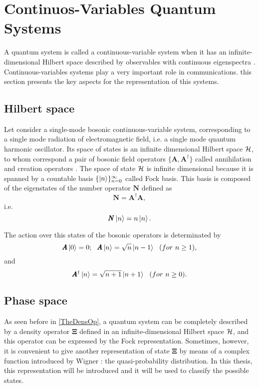 \section{Continuos-Variables Quantum Systems}
    A quantum system is called a continuous-variable system
    when it has an infinite-dimensional Hilbert space described
    by observables with continuous eigenspectra \cite{ContinuousVar}.
    Continuous-variables systems play a very important role in communications. this
    section presents the key aspects for the representation of this systems.
            
    \subsection{Hilbert space}
        Let consider a single-mode bosonic continuous-variable system, corresponding to a single
        mode radiation of electromagnetic field, i.e. a single mode quantum harmonic oscillator.
        Its space of states is an infinite dimensional Hilbert space $\mathcal{H}$, to whom correspond
        a pair of bosonic field operators $\{ \pmb{A},\pmb{A}^{\dagger}\}$ called annihilation
        and creation operators \cite{ContinuousVar}.
        The space of state $\mathcal{H}$ is infinite dimensional because it is spanned by a countable
        basis $\{\ket{n}\}_{n=0}^\infty$ called Fock basis. This basis is composed of the
        eigenstates of the number operator $\pmb{N}$ defined as
        \begin{equation}
            \pmb{N}=\pmb{A}^\dagger \pmb{A},
        \end{equation}
        i.e. 
        \begin{equation*}
            \pmb{N}\ket{n}=n\ket{n}.
        \end{equation*}

        The action over this states of the bosonic operators is determinated by \cite{ContinuousVar}
        \begin{equation}
            \pmb{A}\ket{0}=0;\ \ \pmb{A}\ket{n}=\sqrt{n}\ket{n-1}\ \ (for\ n \geq 1),
        \end{equation}
        and
        \begin{equation*}
            \pmb{A}^\dagger\ket{n}=\sqrt{n+1}\ket{n+1}\ \ (for\ n \geq 0).
        \end{equation*}
        
        
    \subsection{Phase space}
        As seen before in \ref{TheDensOp}, a quantum system can be completely
        described by a density operator $\pmb{\Xi}$ defined in an infinite-dimensional Hilbert space
        $\mathcal{H}$, and this operator can be expressed by the Fock representation. %
        Sometimes, however, it is convenient to give another representation of state $\pmb{\Xi}$ by
        means of a complex function introduced by Wigner \cite{Wigner}: the quasi-probability 
        distribution. In this thesis, this representation will be introduced and it will be used to
        classify the possible states.

